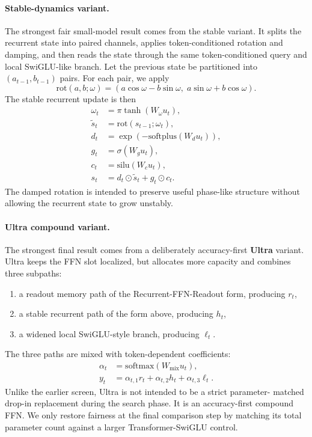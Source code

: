 \documentclass[11pt]{article}
\begin{document}
\paragraph{Stable-dynamics variant.}
The strongest fair small-model result comes from the stable variant. It splits
the recurrent state into paired channels, applies token-conditioned rotation
and damping, and then reads the state through the same token-conditioned query
and local SwiGLU-like branch. Let the previous state be partitioned into
$(a_{t-1}, b_{t-1})$ pairs. For each pair, we apply
\begin{equation}
\mathrm{rot}(a, b; \omega) =
\left(a \cos \omega - b \sin \omega,\; a \sin \omega + b \cos \omega\right).
\end{equation}
The stable recurrent update is then
\begin{align}
\omega_t &= \pi \tanh(W_\omega u_t), \\
\tilde{s}_t &= \mathrm{rot}(s_{t-1}; \omega_t), \\
d_t &= \exp(-\mathrm{softplus}(W_d u_t)), \\
g_t &= \sigma(W_g u_t), \\
c_t &= \mathrm{silu}(W_c u_t), \\
s_t &= d_t \odot \tilde{s}_t + g_t \odot c_t.
\end{align}
The damped rotation is intended to preserve useful phase-like structure without
allowing the recurrent state to grow unstably.

\paragraph{Ultra compound variant.}
The strongest final result comes from a deliberately accuracy-first
\textbf{Ultra} variant. Ultra keeps the FFN slot localized, but allocates more
capacity and combines three subpaths:
\begin{enumerate}[leftmargin=1.25em]
  \item a readout memory path of the Recurrent-FFN-Readout form, producing
  $r_t$,
  \item a stable recurrent path of the form above, producing $h_t$,
  \item a widened local SwiGLU-style branch, producing $\ell_t$.
\end{enumerate}
The three paths are mixed with token-dependent coefficients:
\begin{align}
\alpha_t &= \mathrm{softmax}(W_{\text{mix}} u_t), \\
y_t &= \alpha_{t,1} r_t + \alpha_{t,2} h_t + \alpha_{t,3} \ell_t.
\end{align}
Unlike the earlier screen, Ultra is not intended to be a strict parameter-
matched drop-in replacement during the search phase. It is an accuracy-first
compound FFN. We only restore fairness at the final comparison step by matching
its total parameter count against a larger Transformer-SwiGLU control.
\end{document}
